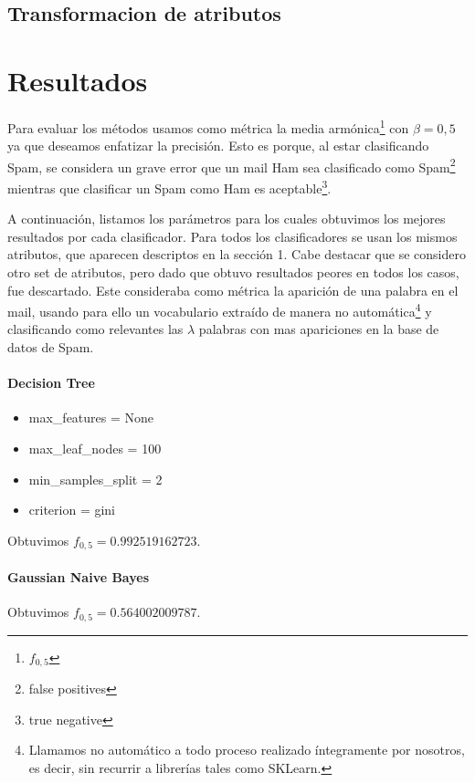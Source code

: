 \documentclass[hidelinks,a4paper,11pt, nofootinbib]{article}
\begin{document}
\subsection{Transformacion de atributos}

\section{Resultados}

Para evaluar los métodos usamos como métrica la media armónica\footnote{$f_{0,5}$} con $\beta = 0,5$ ya que deseamos enfatizar la precisión. Esto es porque, al estar clasificando Spam, se considera un 
grave error que un mail Ham sea clasificado como Spam\footnote{false positives} mientras que clasificar un Spam como Ham es aceptable\footnote{true negative}.

A continuación, listamos los parámetros para los cuales obtuvimos los mejores resultados por cada clasificador. Para todos los clasificadores se usan los mismos
atributos, que aparecen descriptos en la sección 1. Cabe destacar que se considero otro set de atributos, pero dado que obtuvo resultados peores en todos los casos, 
fue descartado. Este consideraba como métrica la aparición de una palabra en el mail, usando para ello un vocabulario extraído de manera no 
automática\footnote{Llamamos no automático a todo proceso realizado íntegramente por nosotros, es decir, sin recurrir a librerías tales como SKLearn.} y 
clasificando como relevantes las $\lambda$ palabras con mas apariciones en la base de datos de Spam.

\paragraph{Decision Tree} 
\begin{itemize}
 \item max\_features = None
 \item max\_leaf\_nodes = 100 
 \item min\_samples\_split = 2 
 \item criterion = gini
\end{itemize}

Obtuvimos $f_{0,5} = 0.992519162723$.

\paragraph{Gaussian Naive Bayes}

Obtuvimos $f_{0,5} = 0.564002009787$.
\end{document}
